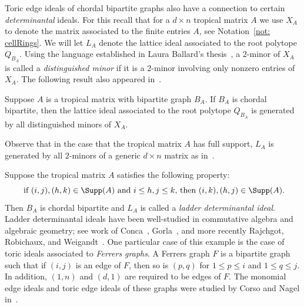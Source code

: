Toric edge ideals of chordal bipartite graphs also have a connection to certain \emph{determinantal} ideals.  For this recall that for a $d \times n$ tropical matrix $A$ we use $X_A$ to denote the matrix associated to the finite entries $A$, see Notation~\ref{not: cellRings}.  We will let $L_A$ denote the lattice ideal associated to the root polytope $Q_{B_A}$.
Using the language established in Laura Ballard's thesis~\cite{ballard2021properties}, a $2$-minor of $X_A$ is called a \emph{distinguished minor} if it is a $2$-minor involving only nonzero entries of $X_A$. 
The following result also appeared in~\cite{ballard2021properties}.

\begin{prop}\label{prop: ladder-like} Suppose $A$ is a tropical matrix with bipartite graph $B_A$. If $B_A$ is chordal bipartite, then the lattice ideal associated to the root polytope $Q_{B_A}$ is generated by all distinguished minors of $X_A$.
\end{prop}

Observe that in the case that the tropical matrix $A$ has full support, $L_A$ is generated by all $2$-minors of a generic $d\times n$ matrix as in~\cite{block2006tropical}.

\begin{example}\label{ex: ladder} Suppose the tropical matrix $A$ satisfies the following property:
$$
\text{ if $(i,j),(h,k)\in \Supp(A)$ and $i\leq h, j\leq k$, then $(i,k),(h,j)\in\Supp(A)$}.
$$
Then $B_A$ is chordal bipartite and $L_A$ is called a \emph{ladder determinantal ideal}.
Ladder determinantal ideals have been well-studied in commutative algebra and algebraic geometry; see work of Conca~\cite{conca1995, conca1996gorenstein}, Gorla~\cite{gorla2007mixed}, and more recently Rajchgot, Robichaux, and Weigandt~\cite{rajchgot2022castelnuovo}.
One particular case of this example is the case of toric ideals associated to \textit{Ferrers graphs}. A Ferrers graph $F$ is a bipartite graph such that if $(i,j)$ is an edge of $F$, then so is $(p,q)$ for $1\leq p\leq i$ and $1\leq q \leq j$. In addition, $(1, n)$ and $(d, 1)$ are required to be edges of $F$. The monomial edge ideals and toric edge ideals of these graphs were studied by Corso and Nagel in~\cite{corso2008specializations, corso2009}.
\end{example}

